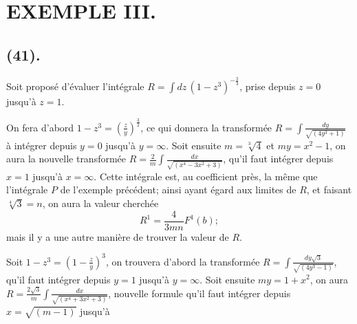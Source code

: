 \documentclass{article}
\begin{document}
\section*{EXEMPLE III.}

\subsection*{(41).}

Soit proposé d'évaluer l'intégrale $R=\displaystyle\int dz\,(1-z^{3})^{-\frac{2}{3}}$, prise depuis $z=0$ jusqu'à $z=1$.

On fera d'abord $1-z^{3}=\left(\frac{z}{y}\right)^{\frac{3}{2}}$, ce qui donnera la transformée $R=\displaystyle\int\frac{dy}{\sqrt{(4y^{3}+1)}}$ à intégrer depuis $y=0$ jusqu'à $y=\infty$. Soit ensuite $m=\sqrt[3]{4}$ et $my=x^{2}-1$, on aura la nouvelle transformée $R=\frac{2}{m}\displaystyle\int\frac{dx}{\sqrt{(x^{4}-3x^{2}+3)}}$, qu'il faut intégrer depuis $x=1$ jusqu'à $x=\infty$. Cette intégrale est, au coefficient près, la même que l'intégrale $P$ de l'exemple précédent; ainsi ayant égard aux limites de $R$, et faisant $\sqrt[4]{3}=n$, on aura la valeur cherchée
\[ R^{1}=\frac{4}{3mn}F^{1}(b); \]
mais il y a une autre manière de trouver la valeur de $R$.

Soit $1-z^{3}=\left(1-\frac{z}{y}\right)^{3}$, on trouvera d'abord la transformée $R=\displaystyle\int\frac{dy\sqrt{3}}{\sqrt{(4y^{3}-1)}}$, qu'il faut intégrer depuis $y=1$ jusqu'à $y=\infty$. Soit ensuite $my=1+x^{2}$, on aura $R=\frac{2\sqrt{3}}{m}\displaystyle\int\frac{dx}{\sqrt{(x^{4}+3x^{2}+3)}}$, nouvelle formule qu'il faut intégrer depuis $x=\sqrt{(m-1)}$ jusqu'à
\end{document}
